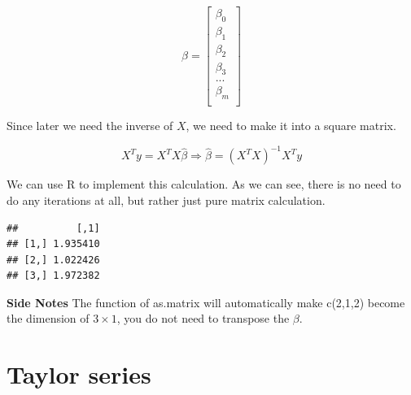 \documentclass[
]{book}
\newenvironment{Shaded}{\begin{snugshade}}{\end{snugshade}}
\newcommand{\CommentTok}[1]{\textcolor[rgb]{0.56,0.35,0.01}{\textit{#1}}}
\newcommand{\DataTypeTok}[1]{\textcolor[rgb]{0.13,0.29,0.53}{#1}}
\newcommand{\DecValTok}[1]{\textcolor[rgb]{0.00,0.00,0.81}{#1}}
\newcommand{\KeywordTok}[1]{\textcolor[rgb]{0.13,0.29,0.53}{\textbf{#1}}}
\newcommand{\NormalTok}[1]{#1}
\newcommand{\OperatorTok}[1]{\textcolor[rgb]{0.81,0.36,0.00}{\textbf{#1}}}
\begin{document}
\[\beta = \begin{bmatrix}\beta_0 \\
\beta_1 \\
\beta_2 \\
\beta_3 \\
...\\
\beta_m \\
\end{bmatrix}\]

Since later we need the inverse of \(X\), we need to make it into a square matrix.

\[X^Ty=X^TX \hat{\beta} \Rightarrow \hat{\beta} = (X^TX)^{-1} X^Ty\]

We can use R to implement this calculation. As we can see, there is no need to do any iterations at all, but rather just pure matrix calculation.

\begin{Shaded}
\end{Shaded}

\begin{verbatim}
##          [,1]
## [1,] 1.935410
## [2,] 1.022426
## [3,] 1.972382
\end{verbatim}

\textbf{Side Notes}
The function of as.matrix will automatically make c(2,1,2) become the dimension of \(3 \times 1\), you do not need to transpose the \(\beta\).

\hypertarget{taylor-series}{%
\section{Taylor series}\label{taylor-series}}
\end{document}
